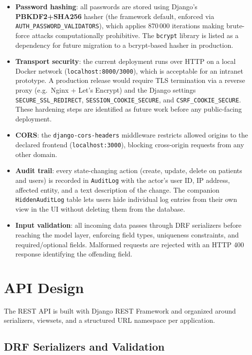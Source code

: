 \documentclass[12pt,a4paper,twoside]{report}
\begin{document}
\begin{itemize}
  \item \textbf{Password hashing}: all passwords are stored using Django's \textbf{PBKDF2+SHA256} hasher (the framework default, enforced via \texttt{AUTH\_PASSWORD\_VALIDATORS}), which applies 870\,000 iterations making brute-force attacks computationally prohibitive. The \texttt{bcrypt} library is listed as a dependency for future migration to a bcrypt-based hasher in production.
  \item \textbf{Transport security}: the current deployment runs over HTTP on a local Docker network (\texttt{localhost:8000/3000}), which is acceptable for an intranet prototype. A production release would require TLS termination via a reverse proxy (e.g.\ Nginx + Let's Encrypt) and the Django settings \texttt{SECURE\_SSL\_REDIRECT}, \texttt{SESSION\_COOKIE\_SECURE}, and \texttt{CSRF\_COOKIE\_SECURE}. These hardening steps are identified as future work before any public-facing deployment.
  \item \textbf{CORS}: the \texttt{django-cors-headers} middleware restricts allowed origins to the declared frontend (\texttt{localhost:3000}), blocking cross-origin requests from any other domain.
  \item \textbf{Audit trail}: every state-changing action (create, update, delete on patients and users) is recorded in \texttt{AuditLog} with the actor's user ID, IP address, affected entity, and a text description of the change. The companion \texttt{HiddenAuditLog} table lets users hide individual log entries from their own view in the UI without deleting them from the database.
  \item \textbf{Input validation}: all incoming data passes through DRF serializers before reaching the model layer, enforcing field types, uniqueness constraints, and required/optional fields. Malformed requests are rejected with an HTTP 400 response identifying the offending field.
\end{itemize}

\section{API Design}\label{sec:api}

The REST API is built with Django REST Framework and organized around serializers, viewsets, and a structured URL namespace per application.

\subsection{DRF Serializers and Validation}
\end{document}
